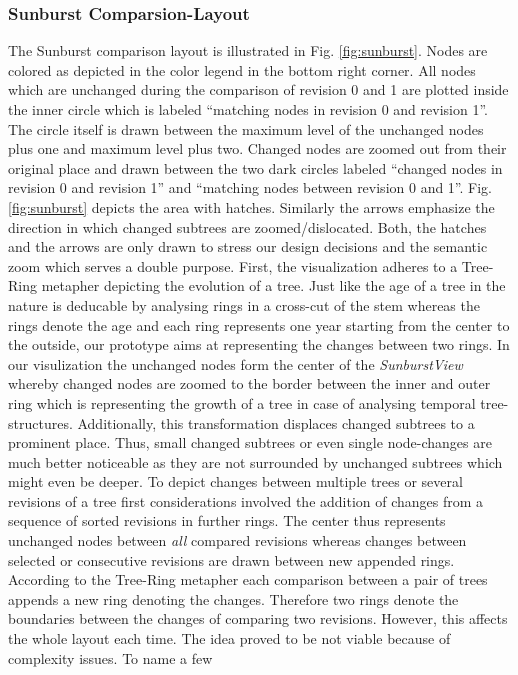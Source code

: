 \subsubsection{Sunburst Comparsion-Layout}
The Sunburst comparison layout is illustrated in Fig. \ref{fig:sunburst}. Nodes are colored as depicted in the color legend in the bottom right corner. All nodes which are unchanged during the comparison of revision 0 and 1 are plotted inside the inner circle which is labeled ``matching nodes in revision 0 and revision 1''. The circle itself is drawn between the maximum level of the unchanged nodes plus one and maximum level plus two. Changed nodes are zoomed out from their original place and drawn between the two dark circles labeled ``changed nodes in revision 0 and revision 1'' and ``matching nodes between revision 0 and 1''. Fig. \ref{fig:sunburst} depicts the area with hatches. Similarly the arrows emphasize the direction in which changed subtrees are zoomed/dislocated. Both, the hatches and the arrows are only drawn to stress our design decisions and the semantic zoom which serves a double purpose. First, the visualization adheres to a Tree-Ring metapher depicting the evolution of a tree. Just like the age of a tree in the nature is deducable by analysing rings in a cross-cut of the stem whereas the rings denote the age and each ring represents one year starting from the center to the outside, our prototype aims at representing the changes between two rings. In our visulization the unchanged nodes form the center of the \emph{SunburstView} whereby changed nodes are zoomed to the border between the inner and outer ring which is representing the growth of a tree in case of analysing temporal tree-structures. Additionally, this transformation displaces changed subtrees to a prominent place. Thus, small changed subtrees or even single node-changes are much better noticeable as they are not surrounded by unchanged subtrees which might even be deeper. To depict changes between multiple trees or several revisions of a tree first considerations involved the addition of changes from a sequence of sorted revisions in further rings. The center thus represents unchanged nodes between \emph{all} compared revisions whereas changes between selected or consecutive revisions are drawn between new appended rings. According to the Tree-Ring metapher each comparison between a pair of trees appends a new ring denoting the changes. Therefore two rings denote the boundaries between the changes of comparing two revisions. However, this affects the whole layout each time. The idea proved to be not viable because of complexity issues. To name a few


